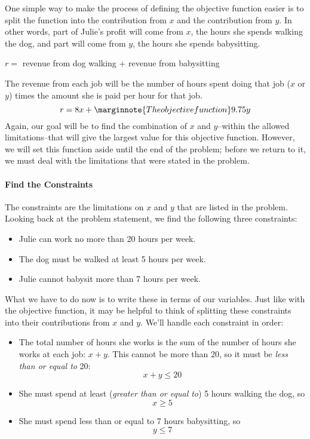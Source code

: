 One simple way to make the process of defining the objective function easier is to split the function into the contribution from $x$ and the contribution from $y$.  In other words, part of Julie's profit will come from $x$, the hours she spends walking the dog, and part will come from $y$, the hours she spends babysitting.
\begin{center}
$r=$ revenue from dog walking $+$ revenue from babysitting
\end{center}
The revenue from each job will be the number of hours spent doing that job ($x$ or $y$) times the amount she is paid per hour for that job.
\[r=8x+\marginnote{The objective function}9.75y\]
Again, our goal will be to find the combination of $x$ and $y$--within the allowed limitations--that will give the largest value for this objective function.  However, we will set this function aside until the end of the problem; before we return to it, we must deal with the limitations that were stated in the problem.\\

\paragraph{Find the Constraints} The constraints are the limitations on $x$ and $y$ that are listed in the problem.  Looking back at the problem statement, we find the following three constraints:
\begin{itemize}
\item Julie can work no more than 20 hours per week.
\item The dog must be walked at least 5 hours per week.
\item Julie cannot babysit more than 7 hours per week.
\end{itemize}
What we have to do now is to write these in terms of our variables.  Just like with the objective function, it may be helpful to think of splitting these constraints into their contributions from $x$ and $y$.  We'll handle each constraint in order:
\begin{itemize}
\item The total number of hours she works is the sum of the number of hours she works at each job: $x+y$.  This cannot be more than 20, so it must be \emph{less than or equal to} 20:
\[x+y \leq 20\]
\item She must spend at least (\emph{greater than or equal to}) 5 hours walking the dog, so
\[x \geq 5\]
\item She must spend less than or equal to 7 hours babysitting, so
\[y \leq 7\]
\end{itemize}

